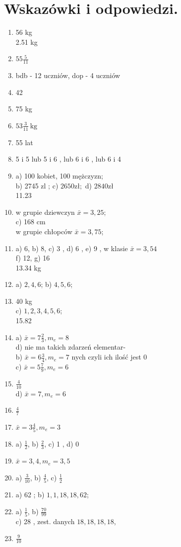 \documentclass[10pt]{article}
\begin{document}
\section*{Wskazówki i odpowiedzi.}
\begin{enumerate}
  \item 56 kg\\
2.51 kg
  \item \(55 \frac{5}{11}\)
  \item bdb - 12 uczniów, dop - 4 uczniów
  \item 42
  \item 75 kg
  \item \(53 \frac{3}{11} \mathrm{~kg}\)
  \item 55 lat
  \item 5 i 5 lub 5 i 6 , lub 6 i 6 , lub 6 i 4
  \item a) 100 kobiet, 100 mężczyzn;\\
b) 2745 zl ; c) \(2650 \mathrm{zł} ;\) d) \(2840 \mathrm{zł}\)\\
11.23
  \item w grupie dziewczyn \(\bar{x}=3,25\);\\
c) 168 cm\\
w grupie chłopców \(\bar{x}=3,75\);
  \item a) 6, b) 8, c) 3 , d) 6 , e) 9 , w klasie \(\bar{x}=3,54\)\\
f) 12, g) 16\\
13.34 kg
  \item a) \(2,4,6\); b) \(4,5,6\);
  \item 40 kg\\
c) \(1,2,3,4,5,6\);\\
15.82
  \item a) \(\bar{x}=7 \frac{2}{3}, m_{e}=8\)\\
d) nie ma takich zdarzeń elementar-\\
b) \(\bar{x}=6 \frac{3}{4}, m_{e}=7\) nych czyli ich ilość jest 0\\
c) \(\bar{x}=5 \frac{7}{9}, m_{e}=6\)
  \item \(\frac{4}{10}\)\\
d) \(\bar{x}=7, m_{e}=6\)
  \item \(\frac{4}{7}\)
  \item \(\bar{x}=3 \frac{4}{5}, m_{e}=3\)
  \item a) \(\frac{1}{2}\), b) \(\frac{2}{3}\), c) 1 , d) 0
  \item \(\bar{x}=3,4, m_{e}=3,5\)
  \item a) \(\frac{3}{10}\), b) \(\frac{4}{5}\), c) \(\frac{1}{2}\)
  \item a) 62 ; b) \(1,1,18,18,62\);
  \item a) \(\frac{1}{5}\), b) \(\frac{70}{99}\)\\
c) 28 , zest. danych \(18,18,18,18\),
  \item \(\frac{9}{10}\)
\end{enumerate}
\end{document}
